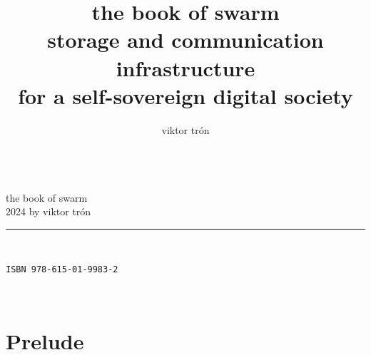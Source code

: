 \documentclass[12pt,openright,hyperfootnotes,hidelinks]{book}
\title{\Huge\sc the book of swarm\\\vskip10pt
\large storage and communication infrastructure\\\vskip-3pt for a self-sovereign digital society\\\vskip10pt}
\author{\sc viktor tr{\'o}n}
\date{}
\newif\ifdraft
\begin{document}
\frontmatter
\maketitle
\ifdraft
Instructions for compiling and distributing.

These are hidden if conditional text is not shown (when publishing a version).

\begin{enumerate}[noitemsep]
    \item any version being worked on should be named "Version vX - worked on";
    \item when publishing, "worked on" should be removed; 
    \item drafttrue line should be commented out removing conditional text upon compilation;
    \item PDF should be generated, saved and pushed to Github repo \\ (https://github.com/ethersphere/publish-bookofswarm/tree/master/pdfs); 
    \item verify that last commit was autodeployed to Swarm \\ (https://swarm-gateways.net/bzz:/latest.bookofswarm.eth/the-book-of-swarm-viktor-tron.pdf);
    \item PDF commit in Github repo should be named with version number;
    \item version number in Latex should be bumped up and "worked on" note added: "Version v(X+1) - worked on";
    \item Goto 1.
\end{enumerate}
\fi
%
\newpage
\pagestyle{empty}
\ \\\vskip14cm
the book of swarm\\
2024 by viktor trón\\\hrule

{
\footnotesize\raggedright\
\doclicenseThis
}
\texttt{ISBN 978-615-01-9983-2}

\newpage

\pagestyle{empty}\ \newpage
\tableofcontents
\listoffigures

\label{sec:toc}
 
\mainmatter
\part{Prelude} 
\label{part:preface}
\pagestyle{fancy}
\fancyhead{} %
\fancyhead[LO]{\leftmark}
\fancyhead[RO]{\thepage}
\fancyhead[LE]{\thepage}
\fancyhead[RE]{\leftmark} %
\fancyfoot{}

\end{document}
